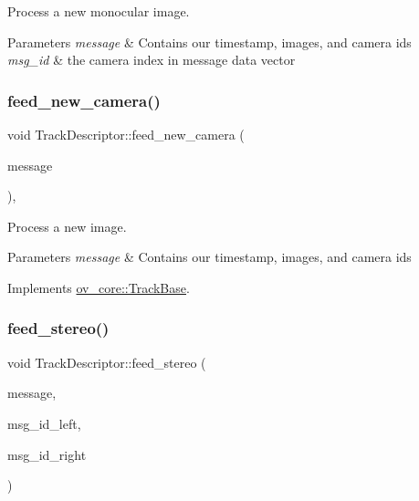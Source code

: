 Process a new monocular image. 


\begin{DoxyParams}{Parameters}
{\em message} & Contains our timestamp, images, and camera ids \\
\hline
{\em msg\+\_\+id} & the camera index in message data vector \\
\hline
\end{DoxyParams}
\mbox{\label{classov__core_1_1TrackDescriptor_afcbf3078992f740582eac24e3164e6f1}} 
\subsubsection{\texorpdfstring{feed\+\_\+new\+\_\+camera()}{feed\_new\_camera()}}
{\footnotesize\ttfamily void Track\+Descriptor\+::feed\+\_\+new\+\_\+camera (\begin{DoxyParamCaption}\item[{const \hyperlink{structov__core_1_1CameraData}{Camera\+Data} \&}]{message }\end{DoxyParamCaption})\hspace{0.3cm}{\ttfamily [override]}, {\ttfamily [virtual]}}



Process a new image. 


\begin{DoxyParams}{Parameters}
{\em message} & Contains our timestamp, images, and camera ids \\
\hline
\end{DoxyParams}


Implements \hyperlink{classov__core_1_1TrackBase_a18f208f4047e9a1955406806ba68a8c1}{ov\+\_\+core\+::\+Track\+Base}.

\mbox{\label{classov__core_1_1TrackDescriptor_a4f182f8ee96c73f9105a8a1fa3f5eee1}} 
\subsubsection{\texorpdfstring{feed\+\_\+stereo()}{feed\_stereo()}}
{\footnotesize\ttfamily void Track\+Descriptor\+::feed\+\_\+stereo (\begin{DoxyParamCaption}\item[{const \hyperlink{structov__core_1_1CameraData}{Camera\+Data} \&}]{message,  }\item[{size\+\_\+t}]{msg\+\_\+id\+\_\+left,  }\item[{size\+\_\+t}]{msg\+\_\+id\+\_\+right }\end{DoxyParamCaption})\hspace{0.3cm}{\ttfamily [protected]}}



